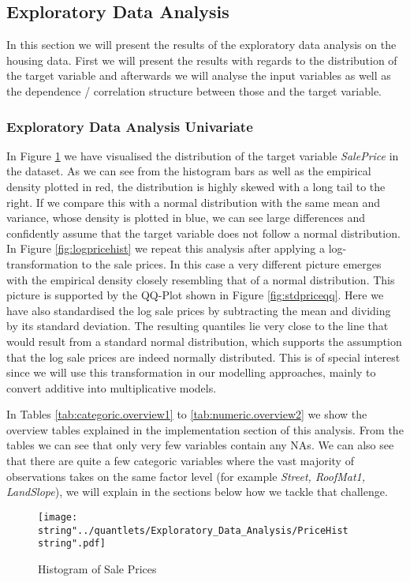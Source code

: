 \subsection{Exploratory Data Analysis}
In this section we will present the results of the exploratory data analysis on the housing data. First we will present the results with regards to the distribution of the target variable and afterwards we will analyse the input variables as well as the dependence / correlation structure between those and the target variable. 
\subsubsection{Exploratory Data Analysis Univariate}
In Figure \ref{fig:pricehist} we have visualised the distribution of the target variable \textit{SalePrice} in the dataset. As we can see from the histogram bars as well as the empirical density plotted in red, the distribution is highly skewed with a long tail to the right. If we compare this with a normal distribution with the same mean and variance, whose density is plotted in blue, we can see large differences and confidently assume that the target variable does not follow a normal distribution. 
In Figure \ref{fig:logpricehist} we repeat this analysis after applying a log-transformation to the sale prices. In this case a very different picture emerges with the empirical density closely resembling that of a normal distribution. This picture is supported by the QQ-Plot shown in Figure \ref{fig:stdpriceqq}. Here we have also standardised the log sale prices by subtracting the mean and dividing by its standard deviation. The resulting quantiles lie very close to the line that would result from a standard normal distribution, which supports the assumption that the log sale prices are indeed normally distributed. This is of special interest since we will use this transformation in our modelling approaches, mainly to convert additive into multiplicative models. 

In Tables \ref{tab:categoric.overview1} to \ref{tab:numeric.overview2} we show the overview tables explained in the implementation section of this analysis. From the tables we can see that only very few variables contain any NAs. We can also see that there are quite a few categoric variables where the vast majority of observations takes on the same factor level (for example \textit{Street, RoofMat1, LandSlope}), we will explain in the sections below how we tackle that challenge.

\begin{figure}[H]
  \centering
\texttt{[image: \\string"../quantlets/Exploratory\_Data\_Analysis/PriceHist\\string".pdf]}
  \caption{Histogram of Sale Prices}\label{fig:pricehist}
\end{figure}

